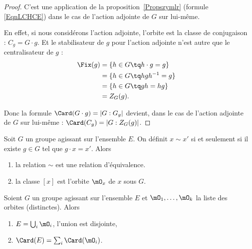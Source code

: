 \begin{proof}
	C'est une application de la proposition~\ref{Propszymlr} (formule \eqref{EqnLCHCE}) dans le cas de l'action adjointe de \( G\) sur lui-même.

	En effet, si nous considérons l'action adjointe, l'orbite est la classe de conjugaison : \( C_g=G\cdot g\). Et le stabilisateur de \( g\) pour l'action adjointe n'est autre que le centralisateur de \( g\) :
	\begin{subequations}
		\begin{align}
			\Fix(g) & =\{ h\in G\tq h\cdot g=g \} \\
			        & =\{ h\in G\tq hgh^{-1}=g \} \\
			        & =\{ h\in G\tq gh=hg \}      \\
			        & =Z_G(g).
		\end{align}
	\end{subequations}

	Donc la formule \( \Card(G\cdot g)=| G:G_g |\) devient, dans le cas de l'action adjointe de \( G\) sur lui-même : \( \Card(C_g)=| G:Z_G(g) |\).
\end{proof}

\begin{lemma}
	Soit \( G\) un groupe agissant sur l'ensemble \( E\). On définit \( x\sim x'\) si et seulement si il existe \( g\in G\) tel que \( g\cdot x=x'\). Alors
	\begin{enumerate}
		\item
		      la relation \( \sim\) est une relation d'équivalence.
		\item
		      la classe \( [x]\) est l'orbite \( \mO_x\) de \( x\) sous \( G\).
	\end{enumerate}
\end{lemma}

\begin{corollary} \label{CorARFVMP}
	Soient \( G\) un groupe agissant sur l'ensemble \( E\) et \( \mO_1,\ldots, \mO_k  \) la liste des orbites (distinctes). Alors
	\begin{enumerate}
		\item
		      \( E=\bigcup_i\mO_i\), l'union est disjointe,
		\item
		      \( \Card(E)=\sum_i\Card(\mO_i)\).
	\end{enumerate}
\end{corollary}

